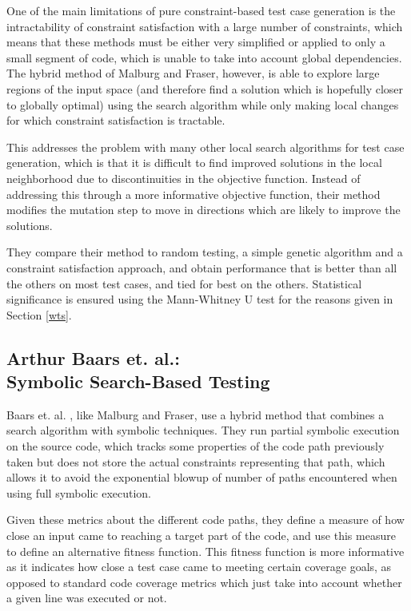 \documentclass{sig-alternate-05-2015}
\begin{document}
One of the main limitations of pure constraint-based test case generation is
the intractability of constraint satisfaction with a large number of
constraints, which means that these methods must be either very simplified or
applied to only a small segment of code, which is unable to take into account
global dependencies. The hybrid method of Malburg and Fraser, however, is able
to explore large regions of the input space (and therefore find a solution
which is hopefully closer to globally optimal) using the search algorithm while
only making local changes for which constraint satisfaction is tractable.

This addresses the problem with many other local search algorithms for test
case generation, which is that it is difficult to find improved solutions in
the local neighborhood due to discontinuities in the objective function.
Instead of addressing this through a more informative objective function, their
method modifies the mutation step to move in directions which are likely to
improve the solutions.

They compare their method to random testing, a simple genetic algorithm and a
constraint satisfaction approach, and obtain performance that is better than
all the others on most test cases, and tied for best on the others. Statistical
significance is ensured using the Mann-Whitney U test for the reasons given in
Section \ref{wts}.

\subsection{Arthur Baars et. al.: \\Symbolic Search-Based Testing}

Baars et. al. \cite{baars}, like Malburg and Fraser, use a hybrid method that
combines a search algorithm with symbolic techniques. They run partial symbolic
execution on the source code, which tracks some properties of the code path
previously taken but does not store the actual constraints representing that
path, which allows it to avoid the exponential blowup of number of paths
encountered when using full symbolic execution.

Given these metrics about the different code paths, they define a measure of
how close an input came to reaching a target part of the code, and use this
measure to define an alternative fitness function. This fitness function is
more informative as it indicates how close a test case came to meeting certain
coverage goals, as opposed to standard code coverage metrics which just take
into account whether a given line was executed or not.
\end{document}
